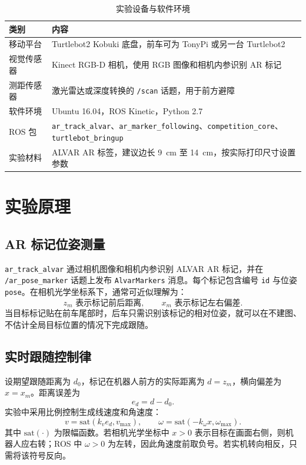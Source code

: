 \documentclass[UTF8,a4paper,12pt]{ctexart}
\begin{document}
	\begin{table}[H]
		\centering
		\caption{实验设备与软件环境}
		\label{tab:devices}
		\begin{tabular}{ll}
			\toprule
			类别 & 内容 \\
			\midrule
			移动平台 & Turtlebot2 Kobuki 底盘，前车可为 TonyPi 或另一台 Turtlebot2 \\
			视觉传感器 & Kinect RGB-D 相机，使用 RGB 图像和相机内参识别 AR 标记 \\
			测距传感器 & 激光雷达或深度转换的 \texttt{/scan} 话题，用于前方避障 \\
			软件环境 & Ubuntu 16.04，ROS Kinetic，Python 2.7 \\
			ROS 包 & \texttt{ar\_track\_alvar}、\texttt{ar\_marker\_following}、\texttt{competition\_core}、\texttt{turtlebot\_bringup} \\
			实验材料 & ALVAR AR 标签，建议边长 \SI{9}{cm} 至 \SI{14}{cm}，按实际打印尺寸设置参数 \\
			\bottomrule
		\end{tabular}
	\end{table}

	\section{实验原理}

	\subsection{AR 标记位姿测量}
	\texttt{ar\_track\_alvar} 通过相机图像和相机内参识别 ALVAR AR 标记，并在 \texttt{/ar\_pose\_marker} 话题上发布 \texttt{AlvarMarkers} 消息。每个标记包含编号 \texttt{id} 与位姿 \texttt{pose}。在相机光学坐标系下，通常可近似理解为：
	\begin{equation}
		z_m \text{ 表示标记前后距离}, \qquad x_m \text{ 表示标记左右偏差}.
	\end{equation}
	当目标标记贴在前车尾部时，后车只需识别该标记的相对位姿，就可以在不建图、不估计全局目标位置的情况下完成跟随。

	\subsection{实时跟随控制律}
	设期望跟随距离为 \(d_0\)，标记在机器人前方的实际距离为 \(d=z_m\)，横向偏差为 \(x=x_m\)。距离误差为
	\begin{equation}
		e_d=d-d_0.
	\end{equation}
	实验中采用比例控制生成线速度和角速度：
	\begin{equation}
		v=\mathrm{sat}(k_v e_d, v_{\max}), \qquad
		\omega=\mathrm{sat}(-k_\omega x, \omega_{\max}).
	\end{equation}
	其中 \(\mathrm{sat}(\cdot)\) 为限幅函数。若相机光学坐标中 \(x>0\) 表示目标在画面右侧，则机器人应右转；ROS 中 \(\omega>0\) 为左转，因此角速度前取负号。若实机转向相反，只需将该符号反向。
\end{document}
